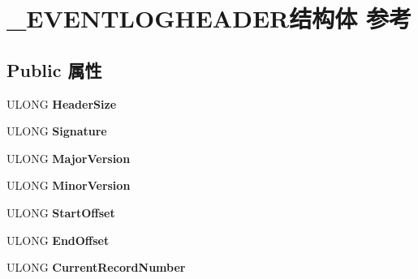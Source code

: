 \hypertarget{struct___e_v_e_n_t_l_o_g_h_e_a_d_e_r}{}\section{\+\_\+\+E\+V\+E\+N\+T\+L\+O\+G\+H\+E\+A\+D\+E\+R结构体 参考}
\label{struct___e_v_e_n_t_l_o_g_h_e_a_d_e_r}
\subsection*{Public 属性}
\begin{DoxyCompactItemize}
\item 
\mbox{\label{struct___e_v_e_n_t_l_o_g_h_e_a_d_e_r_a7b5ca8c249ae8a0eb70bb14f6443f715}} 
U\+L\+O\+NG {\bfseries Header\+Size}
\item 
\mbox{\label{struct___e_v_e_n_t_l_o_g_h_e_a_d_e_r_a57cb1e1264027e992b38e3ae7ede1d20}} 
U\+L\+O\+NG {\bfseries Signature}
\item 
\mbox{\label{struct___e_v_e_n_t_l_o_g_h_e_a_d_e_r_a1b620889f190a3b82e152ffea56a0267}} 
U\+L\+O\+NG {\bfseries Major\+Version}
\item 
\mbox{\label{struct___e_v_e_n_t_l_o_g_h_e_a_d_e_r_a5554829653ccbe220f7500864cdfd918}} 
U\+L\+O\+NG {\bfseries Minor\+Version}
\item 
\mbox{\label{struct___e_v_e_n_t_l_o_g_h_e_a_d_e_r_a90693f0644120b19a33ef32e3349ce1c}} 
U\+L\+O\+NG {\bfseries Start\+Offset}
\item 
\mbox{\label{struct___e_v_e_n_t_l_o_g_h_e_a_d_e_r_a7ea6004976c07441bdda73aab85091d5}} 
U\+L\+O\+NG {\bfseries End\+Offset}
\item 
\mbox{\label{struct___e_v_e_n_t_l_o_g_h_e_a_d_e_r_a4070ebb9554aa2f3087127c59607532c}} 
U\+L\+O\+NG {\bfseries Current\+Record\+Number}
\item 
\mbox{\label{struct___e_v_e_n_t_l_o_g_h_e_a_d_e_r_a9dcfbe2c52690061dc086634d3e5215d}} 

\end{DoxyCompactItemize}
